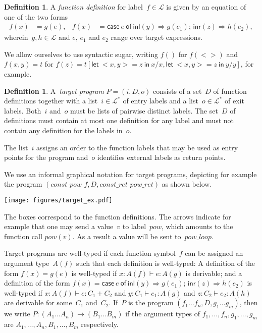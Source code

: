 \documentclass{LMCS}
\theoremstyle{definition}
\newtheorem{definition}[thm]{Definition}
\theoremstyle{plain}
\newcommand{\kw}[1]{\mathsf{#1}}
\newcommand{\I}[2]{#1 \colon #2}
\newcommand{\SeqTm}[3]{#1 \vdash #2 \colon #3}
\newcommand{\LL}{\mathcal{L}}
\newcommand{\tlet}[3]{\kw{let}\ #2=#1\ \kw{in}\ #3}
\newcommand{\tcase}[5]{\kw{case}\ #1\ \kw{of}\ \kw{inl}(#2) \Rightarrow #3;\, \kw{inr}(#4) \Rightarrow #5}
\begin{document}
\begin{definition}  
  \label{def:def}
  A \emph{function definition} for label~$f\in \LL$ is given by an
  equation of one of the two forms
  \begin{align*}
    f(x) &= g(e),
    &
    f(x) &= \tcase e y {g(e_1)} z {h(e_2)},
\end{align*}
  wherein~$g,h\in\LL$ and $e$, $e_1$ and $e_2$ range over target expressions. 
\end{definition}
We allow ourselves to use syntactic sugar, writing
$f()$ for $f(<>)$
and $f(x,y) = t$ for $f(z) = t[\tlet z {<x,y>} {x}/x, \tlet z {<x,y>}
{y}/y]$, for example.

\begin{definition}
  A~\emph{target program} $P=(i,D,o)$ 
  consists of a set~$D$ of function definitions
  together with a list~$i\in\LL^*$ of entry labels
  and a list~$o\in\LL^*$ of exit labels. Both~$i$
  and~$o$ must be lists of 
  pairwise distinct labels.
  The set~$D$ of definitions must contain at most
  one definition for any label and must not contain
  any definition for the labels in~$o$.
\end{definition}  
The list~$i$ assigns an order to
the function labels that may be used as entry points for the program
and~$o$ identifies external labels as return points.

We use an informal graphical notation for target programs, depicting 
for example the program
$(\textit{const}\,\, \textit{pow}\,\, \textit{f}, D,
\textit{const\_ret}\,\, \textit{pow\_ret})$
as shown below.\\
\begin{center}
\texttt{[image: figures/target\_ex.pdf]}
\end{center}
The boxes correspond to the function definitions.
The arrows indicate for example that one may send a value~$v$ to
label~$\mathit{pow}$, which amounts to the function call $\mathit{pow}(v)$.
As a result a value will be sent to~$\mathit{pow\_loop}$. 

Target programs are well-typed if 
each function symbol~$f$ can be assigned an argument type~$A(f)$
such that each definition is well-typed:
A definition of the form $f(x) = g(e)$ is well-typed if
$\SeqTm{\I x {A(f)}}{e}{A(g)}$ is derivable; and 
a definition of the form
$f(x)= \tcase e y {g(e_1)} z {h(e_2)}$
is well-typed if 
$\SeqTm{\I x {A(f)}}{e}{C_1+C_2}$ and
$\SeqTm{\I y {C_1}}{e_1}{A(g)}$ and
$\SeqTm{\I z {C_2}}{e_2}{A(h)}$
are derivable for some~$C_1$ and~$C_2$.
If~$P$ is the program $(f_1\dots f_n, D, g_1\dots g_m)$, 
then we write $P\colon (A_1 \dots A_n) \to (B_1\dots B_m)$
if the argument types of $f_1,\dots, f_n,g_1,\dots, g_m$ are 
$A_1,\dots, A_n,B_1,\dots,B_m$
respectively.
\end{document}
